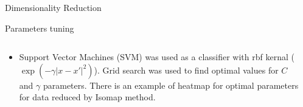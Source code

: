 \documentclass[final,hyperref={pdfpagelabels=false}]{beamer}
\begin{document}
\begin{frame}[t]
\begin{columns}[t]
\begin{column}{.465\textwidth}
\begin{block}{Dimensionality Reduction}
\end{block}


\begin{block}{Parameters tuning}
\begin{columns} %
\begin{column}{.4\textwidth} %
\begin{itemize}
\item Support Vector Machines (SVM) was used as a classifier with rbf kernal ($\exp(-\gamma |x-x'|^2)$). Grid search was used to 
find optimal values for $C$ and $\gamma$ parameters. There is an example of heatmap for optimal parameters for data reduced by Isomap method. 



\end{itemize}
\end{column}

\begin{column}{.4\textwidth}



\end{column}
\end{columns}
\end{block}
\end{column}
\end{columns}
\end{frame}
\end{document}
